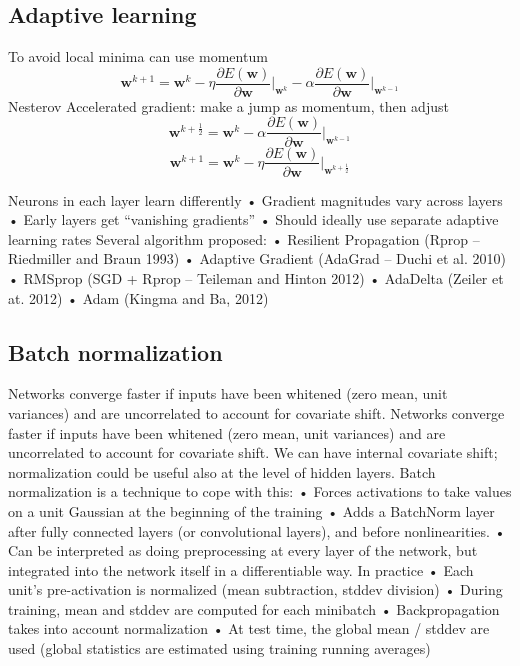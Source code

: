 \subsection{Adaptive learning}
To avoid local minima can use momentum
\[\mathbf{w}^{k+1}=\mathbf{w}^k-\eta\dfrac{\partial E(\mathbf{w})}{\partial \mathbf{w}}\Bigg|_{\mathbf{w}^k}-\alpha\dfrac{\partial E(\mathbf{w})}{\partial \mathbf{w}}\Bigg|_{\mathbf{w}^{k-1}}\]
Nesterov Accelerated gradient: make a jump as momentum, then adjust
\[\mathbf{w}^{k+\frac{1}{2}}=\mathbf{w}^k-\alpha\dfrac{\partial E(\mathbf{w})}{\partial \mathbf{w}}\Bigg|_{\mathbf{w}^{k-1}}\]
\[\mathbf{w}^{k+1}=\mathbf{w}^k-\eta\dfrac{\partial E(\mathbf{w})}{\partial \mathbf{w}}\Bigg|_{\mathbf{w}^{k+\frac{1}{2}}}\]

Neurons in each layer learn differently
• Gradient magnitudes vary across layers
• Early layers get “vanishing gradients”
• Should ideally use separate adaptive learning rates
Several algorithm proposed:
• Resilient Propagation (Rprop – Riedmiller and Braun 1993)
• Adaptive Gradient (AdaGrad – Duchi et al. 2010)
• RMSprop (SGD + Rprop – Teileman and Hinton 2012)
• AdaDelta (Zeiler et at. 2012)
• Adam (Kingma and Ba, 2012)

\subsection{Batch normalization}
Networks converge faster if inputs have been whitened (zero mean, unit
variances) and are uncorrelated to account for covariate shift.
Networks converge faster if inputs have been whitened (zero mean, unit
variances) and are uncorrelated to account for covariate shift.
We can have internal covariate shift; normalization
could be useful also at the level of hidden layers.
Batch normalization is a technique to cope with this:
• Forces activations to take values on a unit Gaussian
at the beginning of the training
• Adds a BatchNorm layer after fully connected layers
(or convolutional layers), and before nonlinearities.
• Can be interpreted as doing preprocessing at every layer of the network,
but integrated into the network itself in a differentiable way.
In practice
• Each unit’s pre-activation is normalized
(mean subtraction, stddev division)
• During training, mean and stddev are
computed for each minibatch
• Backpropagation takes into account
normalization
• At test time, the global mean / stddev
are used (global statistics are estimated
using training running averages)



